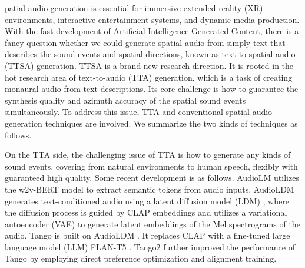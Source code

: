 \documentclass{IEEEtran}
\begin{document}





patial audio generation is essential for immersive extended reality (XR) environments, interactive entertainment systems, and dynamic media production. With the fast development of Artificial Intelligence Generated Content, there is a fancy question whether we could generate spatial audio from simply text that describes the sound events and spatial directions, known as text-to-spatial-audio (TTSA) generation. TTSA is a brand new research direction. It is rooted in the hot research area of text-to-audio (TTA) generation, which is a task of creating monaural audio from text descriptions. Its core challenge is how to guarantee the synthesis quality and azimuth accuracy of the spatial sound events simultaneously. To address this issue, TTA and conventional spatial audio generation techniques are involved. We summarize the two kinds of techniques as follows.

On the TTA side, the challenging issue of TTA is how to generate any kinds of sound events, covering from natural environments to human speech, flexibly with guaranteed high quality. Some recent development is as follows. AudioLM \cite{borsos2023audiolm} utilizes the w2v-BERT model \cite{chung2021w2v} to extract semantic tokens from audio inputs. AudioLDM \cite{liu2023audioldm} generates text-conditioned audio using a latent diffusion model (LDM) \cite{rombach2022high}, where the diffusion process is guided by CLAP embeddings \cite{elizalde2023clap} and utilizes a variational autoencoder (VAE) \cite{kingma2013auto} to generate latent embeddings of the Mel spectrograms of the audio. Tango \cite{ghosal2023tango} is built on AudioLDM \cite{borsos2023audiolm}. It replaces CLAP with a fine-tuned large language model (LLM) FLAN-T5 \cite{chung2024scaling}. Tango2 \cite{majumder2024tango} further improved the performance of Tango by employing direct preference optimization \cite{rafailov2023direct} and alignment training.
\end{document}
